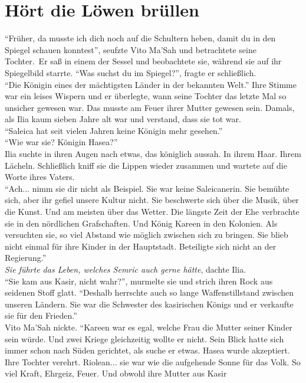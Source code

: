 \chapter{Hört die Löwen brüllen}

``Früher, da musste ich dich noch auf die Schultern heben, damit du in den Spiegel schauen konntest'', seufzte Vito Ma'Sah und betrachtete seine Tochter.\
Er saß in einem der Sessel und beobachtete sie, während sie auf ihr Spiegelbild starrte. 
``Was suchst du im Spiegel?'', fragte er schließlich.\\
``Die Königin eines der mächtigsten Länder in der bekannten Welt.'' Ihre Stimme war ein 
leises Wispern und er überlegte, wann seine Tochter das letzte Mal so unsicher gewesen war. Das 
musste am Feuer ihrer Mutter gewesen sein. Damals, als Ilia kaum sieben Jahre alt war und verstand, 
dass sie tot war.\\
``Saleica hat seit vielen Jahren keine Königin mehr gesehen.''\\
``Wie war sie? Königin Hasea?''\\
Ilia suchte in ihren Augen nach etwas, das königlich aussah. In ihrem Haar. Ihrem Lächeln. 
Schließlich kniff sie die Lippen wieder zusammen und wartete auf die Worte ihres Vaters.\\
``Ach... nimm sie dir nicht als Beispiel. Sie war keine Saleicanerin. Sie bemühte sich, aber ihr 
gefiel unsere Kultur nicht. Sie beschwerte sich über die Musik, über die Kunst. Und am meisten über 
das Wetter. Die längste Zeit der Ehe verbrachte sie in den nördlichen Grafschaften. Und König 
Kareen in den Kolonien. Als versuchten sie, so viel Abstand wie möglich zwischen sich zu bringen. 
Sie blieb nicht einmal für ihre Kinder in der Hauptstadt. Beteiligte sich nicht an der 
Regierung.''\\
\textit{Sie führte das Leben, welches Semric auch gerne hätte}, dachte Ilia.\\
``Sie kam aus Kasir, nicht wahr?'', murmelte sie und strich ihren Rock aus seidenen Stoff 
glatt. ``Deshalb herrschte auch so lange Waffenstillstand zwischen unseren Ländern. Sie war die 
Schwester des kasirischen Königs und er verkaufte sie für den Frieden.''\\
Vito Ma'Sah nickte. ``Kareen war es egal, welche Frau die Mutter seiner Kinder sein würde. Und 
zwei Kriege gleichzeitig wollte er nicht. Sein Blick hatte sich immer schon nach Süden gerichtet, 
als suche er etwas. Hasea wurde akzeptiert. Ihre Tochter verehrt. Riolean... sie war wie die 
aufgehende Sonne für das Volk. So viel Kraft, Ehrgeiz, Feuer. Und obwohl ihre Mutter aus Kasir 
